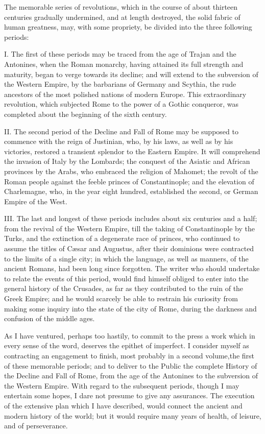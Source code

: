 
The memorable series of revolutions, which in the course of about thirteen centuries gradually undermined, and at length destroyed, the solid fabric of human greatness, may, with some propriety, be divided into the three following periods:

I. The first of these periods may be traced from the age of Trajan and the Antonines, when the Roman monarchy, having attained its full strength and maturity, began to verge towards its decline; and will extend to the subversion of the Western Empire, by the barbarians of Germany and Scythia, the rude ancestors of the most polished nations of modern Europe. This extraordinary revolution, which subjected Rome to the power of a Gothic conqueror, was completed about the beginning of the sixth century.

II. The second period of the Decline and Fall of Rome may be supposed to commence with the reign of Justinian, who, by his laws, as well as by his victories, restored a transient splendor to the Eastern Empire. It will comprehend the invasion of Italy by the Lombards; the conquest of the Asiatic and African provinces by the Arabs, who embraced the religion of Mahomet; the revolt of the Roman people against the feeble princes of Constantinople; and the elevation of Charlemagne, who, in the year eight hundred, established the second, or German Empire of the West.

III. The last and longest of these periods includes about six centuries and a half; from the revival of the Western Empire, till the taking of Constantinople by the Turks, and the extinction of a degenerate race of princes, who continued to assume the titles of Cæsar and Augustus, after their dominions were contracted to the limits of a single city; in which the language, as well as manners, of the ancient Romans, had been long since forgotten. The writer who should undertake to relate the events of this period, would find himself obliged to enter into the general history of the Crusades, as far as they contributed to the ruin of the Greek Empire; and he would scarcely be able to restrain his curiosity from making some inquiry into the state of the city of Rome, during the darkness and confusion of the middle ages.

As I have ventured, perhaps too hastily, to commit to the press a work which in every sense of the word, deserves the epithet of imperfect. I consider myself as contracting an engagement to finish, most probably in a second volume,\footnotemark[2] the first of these memorable periods; and to deliver to the Public the complete History of the Decline and Fall of Rome, from the age of the Antonines to the subversion of the Western Empire. With regard to the subsequent periods, though I may entertain some hopes, I dare not presume to give any assurances. The execution of the extensive plan which I have described, would connect the ancient and modern history of the world; but it would require many years of health, of leisure, and of perseverance.

